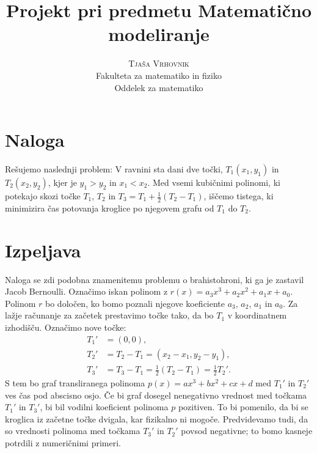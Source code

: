 \documentclass[a4paper]{article}
\begin{document}
\title{\Huge\textbf{Projekt pri predmetu Matematično modeliranje}} 
\author{\large\textsc{Tjaša Vrhovnik}\\
	Fakulteta za matematiko in fiziko\\
	Oddelek za matematiko}

\thispagestyle{empty}

\maketitle

\newpage

\tableofcontents

\newpage


\section{Naloga}

Rešujemo naslednji problem: V ravnini sta dani dve točki, $T_{1}(x_1,y_1)$ in $T_{2}(x_2,y_2)$, kjer je $y_1 > y_2$ in $x_1 < x_2$. Med vsemi kubičnimi polinomi, ki potekajo skozi točke $T_1$, $T_2$ in $T_3 = T_1 + \frac{1}{2} (T_2-T_1)$, iščemo tistega, ki minimizira čas potovanja kroglice po njegovem grafu od $T_1$ do $T_2$.

\section{Izpeljava}

Naloga se zdi podobna znamenitemu problemu o brahistohroni, ki ga je zastavil Jacob Bernoulli.
Označimo iskan polinom z $r(x) = a_{3}x^3+a_{2}x^2+a_{1}x+a_{0}$. Polinom $r$ bo določen, ko bomo poznali njegove koeficiente $a_{3}$, $a_{2}$, $a_{1}$ in $a_{0}$.
Za lažje računanje za začetek prestavimo točke tako, da bo $T_1$ v koordinatnem izhodišču. Označimo nove točke:
\begin{align*}
T_{1}' &= (0,0), \\
T_{2}' &= T_2 - T_1 = (x_2-x_1, y_2-y_1), \\
T_{3}' &= T_3 - T_1 = \frac{1}{2}(T_2 - T_1) = \frac{1}{2}T_{2}'.
\end{align*}
S tem bo graf transliranega polinoma $p(x) = ax^3+bx^2+cx+d$ med $T_{1}'$ in $T_{2}'$ ves čas pod abscisno osjo. Če bi graf dosegel nenegativno vrednost med točkama $T_{1}'$ in $T_{3}'$, bi bil vodilni koeficient polinoma $p$ pozitiven. To bi pomenilo, da bi se kroglica iz začetne točke dvigala, kar fizikalno ni mogoče. Predvidevamo tudi, da so vrednosti polinoma med točkama $T_{3}'$ in $T_{2}'$ povsod negativne; to bomo kasneje potrdili z numeričnimi primeri.
\end{document}
